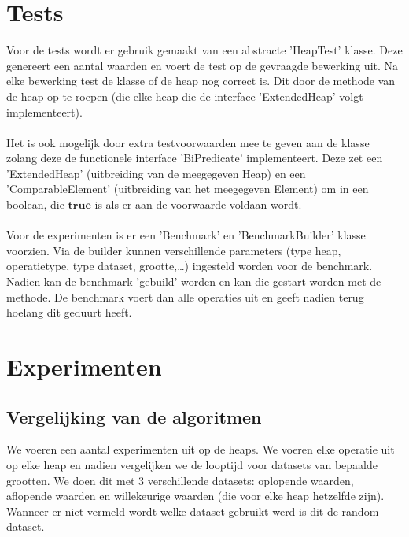 \documentclass[a4paper,12pt]{report}
\begin{document}
\chapter{Tests} %
Voor de tests wordt er gebruik gemaakt van een abstracte 'HeapTest' klasse. Deze genereert een aantal waarden en voert de test op de gevraagde bewerking uit. Na elke bewerking test de klasse of de heap nog correct is. Dit door de  methode van de heap op te roepen (die elke heap die de interface 'ExtendedHeap' volgt implementeert). \\ \\
Het is ook mogelijk door extra testvoorwaarden mee te geven aan de klasse zolang deze de functionele interface 'BiPredicate' implementeert. Deze zet een 'ExtendedHeap' (uitbreiding van de meegegeven Heap) en een 'ComparableElement' (uitbreiding van het meegegeven Element) om in een boolean, die $\bm{true}$ is als er aan de voorwaarde voldaan wordt. \\ \\
Voor de experimenten is er een 'Benchmark' en 'BenchmarkBuilder' klasse voorzien. Via de builder kunnen verschillende parameters (type heap, operatietype, type dataset, grootte,\dots) ingesteld worden voor de benchmark. Nadien kan de benchmark 'gebuild' worden en kan die gestart worden met de  methode. De benchmark voert dan alle operaties uit en geeft nadien terug hoelang dit geduurt heeft.

\chapter{Experimenten} %
\section{Vergelijking van de algoritmen}
We voeren een aantal experimenten uit op de heaps. We voeren elke operatie uit op elke heap en nadien vergelijken we de looptijd voor datasets van bepaalde grootten. We doen dit met 3 verschillende datasets: oplopende waarden, aflopende waarden en willekeurige waarden (die voor elke heap hetzelfde zijn). Wanneer er niet vermeld wordt welke dataset gebruikt werd is dit de random dataset.
\end{document}
